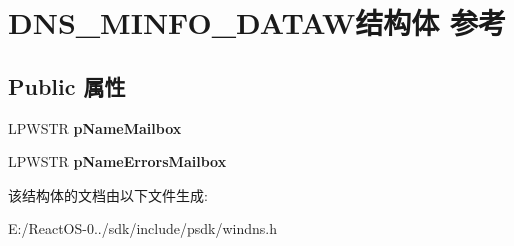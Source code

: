 \hypertarget{struct_d_n_s___m_i_n_f_o___d_a_t_a_w}{}\section{D\+N\+S\+\_\+\+M\+I\+N\+F\+O\+\_\+\+D\+A\+T\+A\+W结构体 参考}
\label{struct_d_n_s___m_i_n_f_o___d_a_t_a_w}
\subsection*{Public 属性}
\begin{DoxyCompactItemize}
\item 
\mbox{\label{struct_d_n_s___m_i_n_f_o___d_a_t_a_w_a155a96b22e376914da47a18238a44d96}} 
L\+P\+W\+S\+TR {\bfseries p\+Name\+Mailbox}
\item 
\mbox{\label{struct_d_n_s___m_i_n_f_o___d_a_t_a_w_a59a2a86e6856d827d33e301a02d40da8}} 
L\+P\+W\+S\+TR {\bfseries p\+Name\+Errors\+Mailbox}
\end{DoxyCompactItemize}


该结构体的文档由以下文件生成\+:\begin{DoxyCompactItemize}
\item 
E\+:/\+React\+O\+S-\/0../sdk/include/psdk/windns.\+h\end{DoxyCompactItemize}
